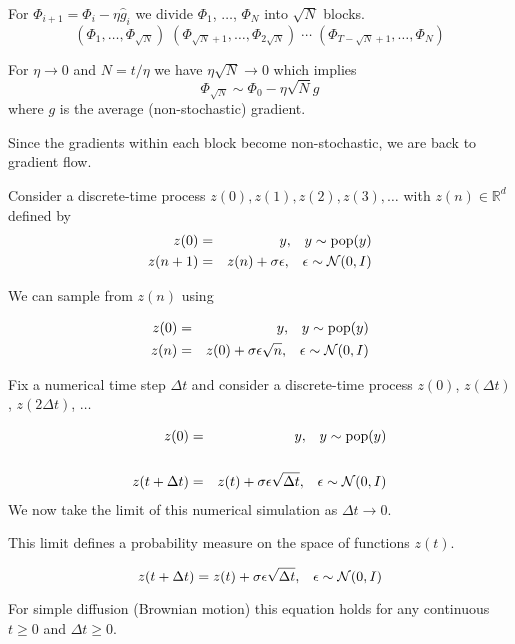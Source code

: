 {
For $\Phi_{i+1} = \Phi_i - \eta \hat{g}_i$ we divide $\Phi_1$, $\ldots$, $\Phi_N$ into $\sqrt{N}$ blocks.
$$(\Phi_1,\dots,\Phi_{\sqrt{N}})\;(\Phi_{\sqrt{N}+1},\ldots,\Phi_{2\sqrt{N}})\;\cdots\;(\Phi_{T-\sqrt{N}+1},\ldots,\Phi_N)$$

\vfill
For $\eta \rightarrow 0$ and $N = t/\eta$ we have $\eta\sqrt{N} \rightarrow 0$ which implies
$$\Phi_{\sqrt{N}} \sim \Phi_0 - \eta\sqrt{N} g$$
where $g$ is the average (non-stochastic)
gradient.

\vfill
Since the gradients within each block become non-stochastic, we are back to gradient flow.


Consider a discrete-time process $z(0),z(1),z(2),z(3),\ldots$ with $z(n)\in \mathbb{R}^d$ defined by
\begin{eqnarray*}
  z(0) & = & y,\;\;\;y \sim \mathrm{pop}(y) \\
  z(n+1) & = & z(n) + \sigma\epsilon,\;\;\;\epsilon \sim {\cal N}(0,I)
\end{eqnarray*}

\vfill
We can sample from $z(n)$ using

\begin{eqnarray*}
  z(0) & = & y,\;\;\;y \sim \mathrm{pop}(y) \\
  z(n) & = & z(0) + \sigma\epsilon\sqrt{n} ,\;\;\;\epsilon \sim {\cal N}(0,I)
\end{eqnarray*}

Fix a numerical time step $\Delta t$ and consider a discrete-time process $z(0)$, $z(\Delta t)$, $z(2\Delta t)$, $\ldots$

{\huge
\begin{eqnarray*}
  z(0) & = & y,\;\;\;y \sim \mathrm{pop}(y) \\
  \\
  z(t+\Delta t) & = & z(t) + \sigma\epsilon\sqrt{\Delta t},\;\;\;\epsilon\sim {\cal N}(0,I) \\
\end{eqnarray*}
}
We now take the limit of this numerical simulation as $\Delta t \rightarrow 0$.

\vfill
This limit defines a probability measure on the space of functions $z(t)$.


$$z(t+\Delta t) =  z(t) + \sigma\epsilon\sqrt{\Delta t},\;\;\;\epsilon \sim {\cal N}(0,I)$$

\vfill
For simple diffusion (Brownian motion) this equation holds for any continuous $t \geq 0$
and $\Delta t \geq 0$.

}

